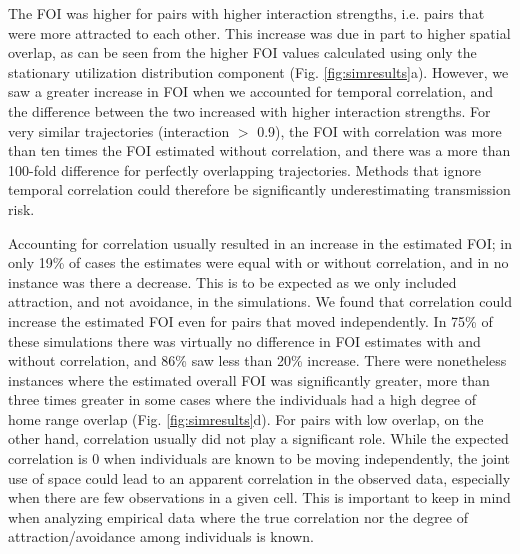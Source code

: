 \documentclass[letterpaper]{article}
\begin{document}
The FOI was higher for pairs with higher interaction strengths, i.e. pairs that were more attracted to each other. This increase was due in part to higher spatial overlap, as can be seen from the higher FOI values calculated using only the stationary utilization distribution component (Fig. \ref{fig:simresults}a). However, we saw a greater increase in FOI when we accounted for temporal correlation, and the difference between the two increased with higher interaction strengths. For very similar trajectories (interaction $>$ 0.9), the FOI with correlation was more than ten times the FOI estimated without correlation, and there was a more than 100-fold difference for perfectly overlapping trajectories. Methods that ignore temporal correlation could therefore be significantly underestimating transmission risk. 

Accounting for correlation usually resulted in an increase in the estimated FOI; in only 19\% of cases the estimates were equal with or without correlation, and in no instance was there a decrease. This is to be expected as we only included attraction, and not avoidance, in the simulations. 
We found that correlation could increase the estimated FOI even for pairs that moved independently. In 75\% of these simulations there was virtually no difference in FOI estimates with and without correlation, and 86\% saw less than 20\% increase. There were nonetheless instances where the estimated overall FOI was significantly greater, more than three times greater in some cases where the individuals had a high degree of home range overlap (Fig. \ref{fig:simresults}d). 
For pairs with low overlap, on the other hand, correlation usually did not play a significant role. %
While the expected correlation is 0 when individuals are known to be moving independently, the joint use of space could lead to an apparent correlation in the observed data, especially when there are few observations in a given cell. This is important to keep in mind when analyzing empirical data where the true correlation nor the degree of attraction/avoidance among individuals is known. 
\end{document}
